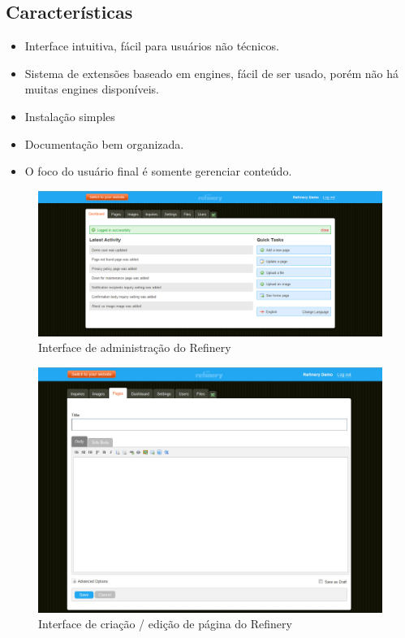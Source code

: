 \subsection{Características}

\begin{itemize}
  \item Interface intuitiva, fácil para usuários não técnicos.
  \item Sistema de extensões baseado em engines, fácil de ser usado, porém não há muitas engines disponíveis.
  \item Instalação simples
  \item Documentação bem organizada.
  \item O foco do usuário final é somente gerenciar conteúdo.
\end{itemize}

\begin{figure}[here]
\includegraphics[width=150mm]{images/refinery_admin.png}
\caption{Interface de administração do Refinery}
\label{fig:refinery_admin.png}
\end{figure}

\begin{figure}[here]
\includegraphics[width=150mm]{images/refinery_new_page.jpg}
\caption{Interface de criação / edição de página do Refinery}
\label{fig:refinery_new_page.jpg}
\end{figure}

